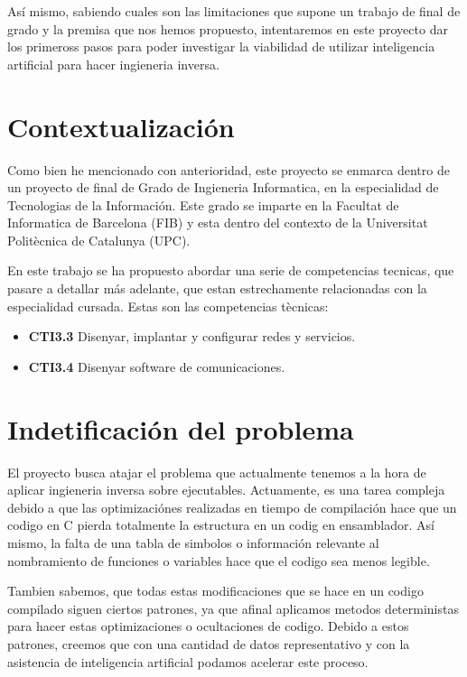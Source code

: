 Así mismo, sabiendo cuales son las limitaciones que supone un trabajo de final de grado y la premisa que nos hemos propuesto, intentaremos en este proyecto dar los primeross pasos 
para poder investigar la viabilidad de utilizar inteligencia artificial para hacer ingieneria inversa.

\section{Contextualización}
\label{sec:contextualizacion}

Como bien he mencionado con anterioridad, este proyecto se enmarca dentro de un proyecto de final de Grado de Ingieneria Informatica, en la especialidad de Tecnologias de la Información.
Este grado se imparte en la Facultat de Informatica de Barcelona (FIB) y esta dentro del contexto de la Universitat Politècnica de Catalunya (UPC).

En este trabajo se ha propuesto abordar una serie de competencias tecnicas, que pasare a detallar más adelante, que estan estrechamente relacionadas con la especialidad cursada. Estas 
son las competencias tècnicas:

\begin{itemize}
    \item \textbf{CTI3.3} Disenyar, implantar y configurar redes y servicios.
    \item \textbf{CTI3.4} Disenyar software de comunicaciones.
\end{itemize}

\section{Indetificación del problema}
\label{sec:problema}

El proyecto busca atajar el problema que actualmente tenemos a la hora de aplicar ingieneria inversa sobre ejecutables. Actuamente, es una tarea compleja debido a que las optimizaciónes
realizadas en tiempo de compilación hace que un codigo en C pierda totalmente la estructura en un codig en ensamblador. Así mismo, la falta de una tabla de simbolos o información relevante
al nombramiento de funciones o variables hace que el codigo sea menos legible.

Tambien sabemos, que todas estas modificaciones que se hace en un codigo compilado siguen ciertos patrones, ya que afinal aplicamos metodos deterministas para hacer estas optimizaciones 
o ocultaciones de codigo. Debido a estos patrones, creemos que con una cantidad de datos representativo y con la asistencia de inteligencia artificial podamos acelerar este proceso.

